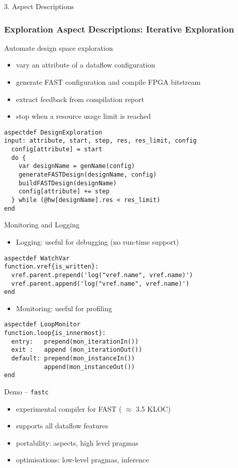 \begin{frame}[fragile]{3. Aspect Descriptions}
  \frametitle{Exploration Aspect Descriptions: Iterative Exploration}
  Automate design space exploration
  \begin{itemize}
  \item vary an attribute of a dataflow configuration
  \item generate FAST configuration and compile FPGA bitstream
  \item extract feedback from compilation report
  \item stop when a resource usage limit is reached
  \end{itemize}
  \begin{lstlisting}[label=lst:label, style=lara]
aspectdef DesignExploration
input: attribute, start, step, res, res_limit, config
  config[attribute] = start
  do {
    var designName = genName(config)
    generateFASTDesign(designName, config)
    buildFASTDesign(designName)
    config[attribute] += step
  } while (@hw[designName].res < res_limit)
end
  \end{lstlisting}
\end{frame}

\begin{frame}[fragile]{Monitoring and Logging}
  \begin{itemize}
  \item Logging: useful for debugging (no run-time support)
  \end{itemize}
  \begin{lstlisting}[label=lst:label, style=lara]
aspectdef WatchVar
function.vref{is_written}:
  vref.parent.prepend('log("vref.name", vref.name)')
  vref.parent.append('log("vref.name", vref.name)')
end
  \end{lstlisting}

  \begin{itemize}
  \item Monitoring: useful for profiling
  \end{itemize}
  \begin{lstlisting}[label=lst:label, style=lara]
aspectdef LoopMonitor
function.loop{is_innermost}:
  entry:   prepend(mon_iterationIn())
  exit :   append (mon_iterationOut())
  default: prepend(mon_instanceIn())
           append(mon_instanceOut())
end
  \end{lstlisting}
\end{frame}

\begin{frame}{Demo -- \texttt{fastc}}
  \begin{figure}[!ht]
    \centering
    \def\svgwidth{\linewidth}
    
  \end{figure}
  \begin{itemize}
    \setlength{\itemsep}{10pt}
  \item experimental compiler for FAST ( $\approx$ 3.5 KLOC)
  \item supports all dataflow features
  \item portability: aspects, high level pragmas
  \item optimisations: low-level pragmas, inference
  \end{itemize}
\end{frame}
